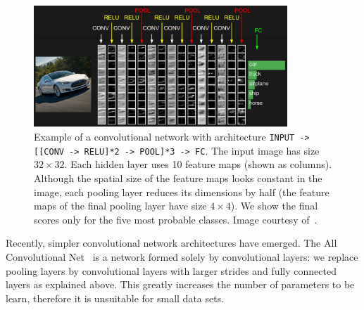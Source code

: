 \begin{figure}[h]
	\centering
	\includegraphics[width = 0.85\textwidth]{plots/convNetExample.jpeg}
	\caption[Example of a convolutional network in action]{Example of a convolutional network with architecture \texttt{INPUT -> [[CONV -> RELU]*2 -> POOL]*3 -> FC}. The input image has size $32\times 32$. Each hidden layer uses 10 feature maps (shown as columns). Although the spatial size of the feature maps looks constant in the image, each pooling layer reduces its dimensions by half (the feature maps of the final pooling layer have size $4\times 4$). We show the final scores only for the five most probable classes. Image courtesy of~\cite{Karpathy2015}.}
	\label{fig:ConvNetExample}
\end{figure}

Recently, simpler convolutional network architectures have emerged. The All Convolutional Net~\cite{Springenberg2014} is a network formed solely by convolutional layers: we replace pooling layers by convolutional layers with larger strides and fully connected layers as explained above. This greatly increases the number of parameters to be learn, therefore it is unsuitable for small data sets.

